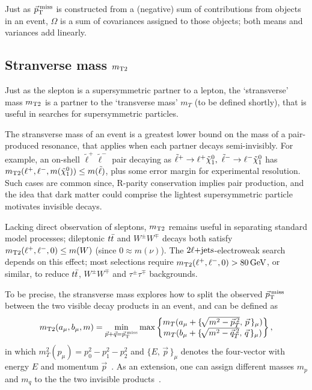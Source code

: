 Just as $\ptmiss$ is constructed from a (negative) sum of contributions from
objects in an event,
$\Omega$ is a sum of covariances assigned to those objects;
both means and variances add linearly.


\subsection{Stranverse mass $\mttwo$}
\label{sec:2ljets_mt2}
Just as the slepton is a supersymmetric partner to a lepton, the `stransverse'
mass  $\mttwo$ is a partner to the `transverse mass' $m_T$
(to be defined shortly),
that is useful in searches for supersymmetric particles.

The stransverse mass of an event is a greatest lower bound on the mass of a
pair-produced resonance, that applies when each partner decays semi-invisibly.
For example, an on-shell $\tilde\ell^+\tilde\ell^-$ pair decaying as
$\tilde\ell^+ \rightarrow \ell^+ \neutralino_1
,~
\tilde\ell^- \rightarrow \ell^- \neutralino_1$ has
$\mttwo(\ell^+, \ell^-, m(\neutralino_1)) \leq m(\tilde\ell)$, plus some error
margin for experimental resolution.
Such cases are common since, R-parity conservation implies pair production,
and the idea that dark matter could comprise the lightest supersymmetric
particle motivates invisible decays.

Lacking direct observation of sleptons, $\mttwo$ remains useful in separating
standard model processes; dileptonic $\ttbar$ and $W^\pm W^\mp$ decays both
satisfy $\mttwo(\ell^+, \ell^-, 0) \leq m(W)$ (since $0 \approx m(\nu)$).
The $\twoljets$-electroweak search depends on this effect;
most selections require $\mttwo(\ell^+, \ell^-, 0) > 80\,\eV[G]$, or similar,
to reduce $\ttbar$, $W^\pm W^\mp$ and $\tau^\pm\tau^\mp$ backgrounds.

To be precise, the stransverse mass explores how to split the observed
$\ptmiss$ between the two visible decay products in an event, and can be
defined as
\begin{equation}
\mttwo(a_\mu, b_\mu, m)
=
\min_{\vec p + \vec q=\ptmiss}
\max
\begin{Bmatrix}
m_T(a_\mu + \{\!\sqrt{m^2 - \vec p_T^{\:2}},\,\vec p\,\}_\mu)\\
m_T(b_\mu + \{\!\sqrt{m^2 - \vec q_T^{\:2}},\,\vec q\,\}_\mu)\\
\end{Bmatrix}
,
\end{equation}
in which $m_T^2(p_\mu) = p_0^2 - p_1^2 - p_2^2$ and $\{E,\,\vec p\,\}_\mu$ denotes
the four-vector with energy $E$ and momentum $\vec p$~\cite{lester1999measuring}.
As an extension, one can assign different masses $m_p$ and $m_q$ to the
the two invisible products~\cite{lester2015bisection}.

